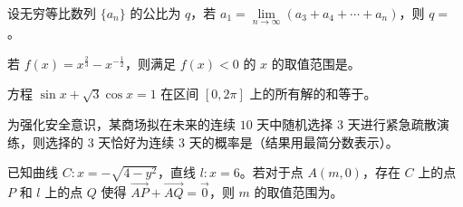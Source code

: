 \begin{question}
设无穷等比数列 $\{a_n\}$ 的公比为 $q$，若 $a_1=\lim\limits_{n\to\infty}(a_3+a_4+\cdots+a_n)$，则 $q=$\gkblank{}。

\end{question}
\begin{question}
若 $f(x)=x^{\frac23}-x^{-\frac12}$，则满足 $f(x)<0$ 的 $x$ 的取值范围是\gkblank{}。

\end{question}
\begin{question}
方程 $\sin x+\sqrt3\cos x=1$ 在区间 $[0,2\pi]$ 上的所有解的和等于\gkblank{}。

\end{question}
\begin{question}
为强化安全意识，某商场拟在未来的连续 $10$ 天中随机选择 $3$ 天进行紧急疏散演练，则选择的 $3$ 天恰好为连续 $3$ 天的概率是\gkblank{}（结果用最简分数表示）。

\end{question}
\begin{question}
已知曲线 $C:x=-\sqrt{4-y^2}$，直线 $l:x=6$。若对于点 $A(m,0)$，存在 $C$ 上的点 $P$ 和 $l$ 上的点 $Q$ 使得 $\overrightarrow{AP}+\overrightarrow{AQ}=\vec{0}$，则 $m$ 的取值范围为\gkblank{}。

\end{question}

